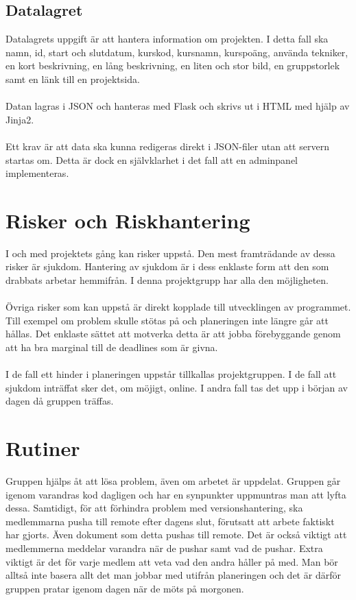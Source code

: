 \documentclass{TDP003mall}
\begin{document}
\subsection{Datalagret}
Datalagrets uppgift är att hantera information om projekten. I detta fall ska
namn, id, start och slutdatum, kurskod, kursnamn, kurspoäng, använda tekniker,
en kort beskrivning, en lång beskrivning, en liten och stor bild, en gruppstorlek
samt en länk till en projektsida.\\\\
Datan lagras i JSON och hanteras med Flask och skrivs ut i HTML med hjälp av Jinja2.\\\\
Ett krav är att data ska kunna redigeras direkt i JSON-filer utan att servern startas om.
Detta är dock en självklarhet i det fall att en adminpanel implementeras.

\section{Risker och Riskhantering}
I och med projektets gång kan risker uppstå. Den mest framträdande av dessa risker
är sjukdom. Hantering av sjukdom är i dess enklaste form att den som drabbats arbetar hemmifrån.
I denna projektgrupp har alla den möjligheten. \\\\
Övriga risker som kan uppstå är direkt kopplade till utvecklingen av programmet.
Till exempel om problem skulle stötas på och planeringen inte längre går att hållas.
Det enklaste sättet att motverka detta är att jobba förebyggande genom 
att ha bra marginal till de deadlines som är givna.\\\\
I de fall ett hinder i planeringen uppstår tillkallas projektgruppen. I de fall att
sjukdom inträffat sker det, om möjigt, online. I andra fall tas det upp i början av dagen
då gruppen träffas.

\section{Rutiner}
Gruppen hjälps åt att lösa problem, även om arbetet är uppdelat. Gruppen går igenom varandras kod dagligen och har en synpunkter
uppmuntras man att lyfta dessa. Samtidigt, för att förhindra problem med versionshantering, ska medlemmarna pusha till remote efter dagens slut,
förutsatt att arbete faktiskt har gjorts. Även dokument som detta pushas till remote. Det är också viktigt att medlemmerna meddelar varandra
när de pushar samt vad de pushar. Extra viktigt är det för varje medlem att veta vad den andra håller på med. Man bör alltså inte basera allt
det man jobbar med utifrån planeringen och det är därför gruppen pratar igenom dagen när de möts på morgonen. 
\end{document}
